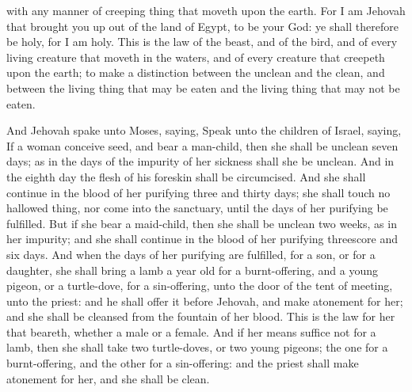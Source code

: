 with any manner of creeping thing that moveth upon the earth. For I am Jehovah that brought you up out of the land of Egypt, to be your God: ye shall therefore be holy, for I am holy.  This is the law of the beast, and of the bird, and of every living creature that moveth in the waters, and of every creature that creepeth upon the earth; to make a distinction between the unclean and the clean, and between the living thing that may be eaten and the living thing that may not be eaten. 

And Jehovah spake unto Moses, saying, Speak unto the children of Israel, saying, If a woman conceive seed, and bear a man-child, then she shall be unclean seven days; as in the days of the impurity of her sickness shall she be unclean. And in the eighth day the flesh of his foreskin shall be circumcised. And she shall continue in the blood of her purifying three and thirty days; she shall touch no hallowed thing, nor come into the sanctuary, until the days of her purifying be fulfilled. But if she bear a maid-child, then she shall be unclean two weeks, as in her impurity; and she shall continue in the blood of her purifying threescore and six days.  And when the days of her purifying are fulfilled, for a son, or for a daughter, she shall bring a lamb a year old for a burnt-offering, and a young pigeon, or a turtle-dove, for a sin-offering, unto the door of the tent of meeting, unto the priest: and he shall offer it before Jehovah, and make atonement for her; and she shall be cleansed from the fountain of her blood. This is the law for her that beareth, whether a male or a female. And if her means suffice not for a lamb, then she shall take two turtle-doves, or two young pigeons; the one for a burnt-offering, and the other for a sin-offering: and the priest shall make atonement for her, and she shall be clean. 


